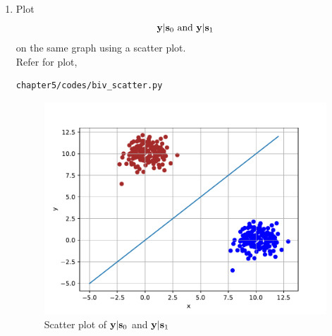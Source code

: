 \begin{enumerate}
\item
\label{ch5_fsk}
Plot 
%
\begin{equation}
\mathbf{y}|\mathbf{s}_0 \text{ and } \mathbf{y}|\mathbf{s}_1
\end{equation}
%
on the same graph using a scatter plot.\\
\solution Refer  for plot,
\begin{lstlisting}
chapter5/codes/biv_scatter.py
\end{lstlisting}
%
\begin{figure}[H]
\centering
\includegraphics[scale=0.8]{chapter5/figs/biv_scatter.pdf}
\caption{Scatter plot of $\mathbf{y}|\mathbf{s}_0$ and $\mathbf{y}|\mathbf{s}_1$ }
\label{fig:biv_scatter}
\end{figure}


\end{enumerate}
